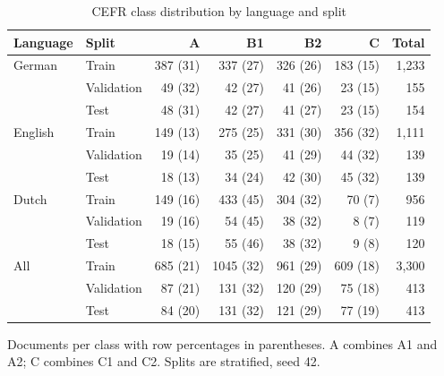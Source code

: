 \begin{table}[htbp]
\centering
\small
\begin{threeparttable}
\caption{CEFR class distribution by language and split}
\label{tab:clf-classes}
\begin{tabular}{llrrrrr}
\hline
Language & Split & A & B1 & B2 & C & Total \\
\hline
German & Train & 387 (31) & 337 (27) & 326 (26) & 183 (15) & 1,233 \\
 & Validation & 49 (32) & 42 (27) & 41 (26) & 23 (15) & 155 \\
 & Test & 48 (31) & 42 (27) & 41 (27) & 23 (15) & 154 \\
\hline
English & Train & 149 (13) & 275 (25) & 331 (30) & 356 (32) & 1,111 \\
 & Validation & 19 (14) & 35 (25) & 41 (29) & 44 (32) & 139 \\
 & Test & 18 (13) & 34 (24) & 42 (30) & 45 (32) & 139 \\
\hline
Dutch & Train & 149 (16) & 433 (45) & 304 (32) & 70 (7) & 956 \\
 & Validation & 19 (16) & 54 (45) & 38 (32) & 8 (7) & 119 \\
 & Test & 18 (15) & 55 (46) & 38 (32) & 9 (8) & 120 \\
\hline
All & Train & 685 (21) & 1045 (32) & 961 (29) & 609 (18) & 3,300 \\
 & Validation & 87 (21) & 131 (32) & 120 (29) & 75 (18) & 413 \\
 & Test & 84 (20) & 131 (32) & 121 (29) & 77 (19) & 413 \\
\hline
\end{tabular}
\begin{tablenotes}
\footnotesize
\item Documents per class with row percentages in parentheses. A combines A1 and A2; C combines C1 and C2. Splits are stratified, seed 42.
\end{tablenotes}
\end{threeparttable}
\end{table}
